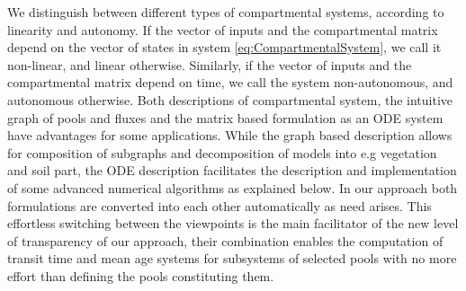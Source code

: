 We distinguish between different types of compartmental systems, according to linearity and autonomy. If the vector of inputs and the compartmental matrix depend on the vector of states in system \eqref{eq:CompartmentalSystem}, we call it non-linear, and linear otherwise. Similarly, if the vector of inputs and the compartmental matrix depend on time, we call the system non-autonomous, and autonomous otherwise. 
Both descriptions of compartmental system, the intuitive graph of pools and fluxes and the 
matrix based formulation as an ODE system have advantages for some applications. 
While the graph based description allows for composition of subgraphs and decomposition of models into e.g vegetation and soil part, the ODE description facilitates the description and implementation of some advanced numerical algorithms as explained below.
In our approach both formulations are converted into each other automatically as need arises.
This effortless switching between the viewpoints is the main facilitator of the new level of transparency of our approach, their combination enables the computation of transit time and mean age systems for subsystems of selected pools with no more effort than defining the pools constituting them.

